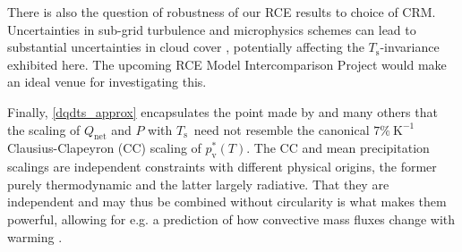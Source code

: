 \documentclass[9pt,twocolumn,twoside,lineno]{pnas-new}
\newcommand{\Qnet}{\ensuremath{Q_\mathrm{net}}}
\newcommand{\Kinverse}{\ensuremath{\mathrm{K^{-1}}}}
\newcommand{\pvstar}{\ensuremath{p^*_{\mathrm{v}}}}
\newcommand{\Ts}{\ensuremath{T_\mathrm{s}}}
\begin{document}
There is also the question of robustness of our RCE results to choice of CRM. Uncertainties in sub-grid turbulence and microphysics schemes can lead to substantial uncertainties in cloud cover \cite[][]{tsushima2015, igel2014}, potentially affecting  the \Ts-invariance exhibited here. The upcoming RCE Model Intercomparison Project \cite[RCEMIP,][]{wing2017b} would make an ideal venue for investigating this.

Finally, \eqref{dqdts_approx} encapsulates  the point made by \cite{stephens2008a,allen2002,mitchell1987} and many others  that the scaling of $\Qnet$ and $P$ with \Ts\ need not resemble the  canonical $7\%\ \Kinverse$ Clausius-Clapeyron (CC) scaling of $\pvstar(T)$.  The CC and mean precipitation scalings  are independent constraints with different physical origins, the former purely thermodynamic and the latter largely radiative. That they are independent and may thus be combined without circularity is what makes them powerful, allowing for e.g. a prediction of how convective mass fluxes change with warming \cite[][]{held2006}.

%
\end{document}
